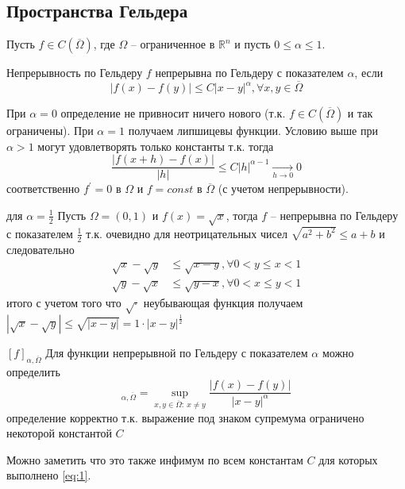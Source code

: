 \documentclass[12pt,a4paper]{article}
\newcommand{\Real}{\mathbb{R}}
\begin{document}
\subsection{Пространства Гельдера}
Пусть $f \in C(\overline{\Omega})$, где $\Omega$ -- ограниченное в $\Real^n$ и пусть $0 \leq \alpha \leq 1$.

\begin{definition}{Непрерывность по Гельдеру}{}
	$f$ непрерывна по Гельдеру с показателем $\alpha$, если
	\begin{equation}\label{eq:1}
		|f(x) - f(y)| \leq C|x - y|^\alpha, \forall x,y \in \overline{\Omega}
	\end{equation}
\end{definition}
При $\alpha = 0$ определение не привносит ничего нового (т.к. $f \in C(\overline{\Omega})$ и так ограничены). При $\alpha = 1$ получаем липшицевы функции. Условию выше при $\alpha > 1$ могут удовлетворять только константы т.к. тогда
\begin{equation*}
	\frac{|f(x+h) - f(x)|}{|h|} \leq C |h|^{\alpha-1} \underset{h\to 0}{\to} 0
\end{equation*}
соответственно $f^\prime = 0$ в $\Omega$ и $f = const$ в $\overline{\Omega}$ (с учетом непрерывности).

\begin{example}{для $\alpha = \frac{1}{2}$}{}
	Пусть $\Omega = (0, 1)$ и $f(x) = \sqrt{x}$, тогда $f$ -- непрерывна по Гельдеру с показателем $\frac{1}{2}$ т.к. очевидно для неотрицательных чисел $\sqrt{a^2 + b^2} \leq a + b$ и следовательно
	\begin{align*}
		\sqrt{x} - \sqrt{y} &\leq \sqrt{x - y}, \forall 0 < y \leq x < 1 \\
		\sqrt{y} - \sqrt{x} &\leq \sqrt{y - x}, \forall 0 < x \leq y < 1
	\end{align*}
	итого с учетом того что $\sqrt{\cdot}$ неубывающая функция получаем \\ $|\sqrt{x} - \sqrt{y}| \leq \sqrt{|x-y|} = 1\cdot|x-y|^{\frac{1}{2}}$
\end{example}

\begin{definition}{$[f]_{\alpha, \overline{\Omega}}$}{}
	Для функции непрерывной по Гельдеру с показателем $\alpha$ можно определить
	\begin{equation*}
		[f]_{\alpha, \overline{\Omega}} = \sup\limits_{x, y \in \overline{\Omega}: \ x \neq y}{\frac{|f(x)-f(y)|}{|x-y|^\alpha}}
	\end{equation*}
	определение корректно т.к. выражение под знаком супремума ограничено некоторой константой $C$
\end{definition}
Можно заметить что это также инфимум по всем константам $C$ для которых выполнено \eqref{eq:1}.
\end{document}
